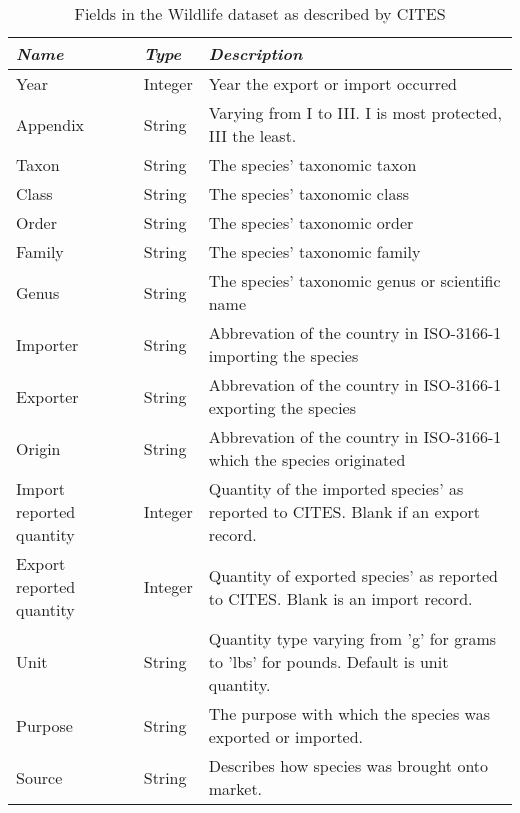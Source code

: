 \begin{table}[!ht]
\begin{tabular}{ l l p{8cm} }
\hline
\emph{Name} & \emph{Type} & \emph{Description} \\
\hline
Year & Integer & Year the export or import occurred \\ \hline
Appendix & String & Varying from I to III. I is most protected, III the least. \\ \hline 
Taxon & String & The species' taxonomic taxon \\ \hline 
Class & String & The species' taxonomic class \\ \hline 
Order & String & The species' taxonomic order \\ \hline 
Family & String & The species' taxonomic family \\ \hline 
Genus & String & The species' taxonomic genus or scientific name \\ \hline 
Importer & String & Abbrevation of the country in ISO-3166-1 importing the species \\ \hline 
Exporter & String & Abbrevation of the country in ISO-3166-1 exporting the species \\ \hline
Origin & String & Abbrevation of the country in ISO-3166-1 which the species originated \\ \hline
Import reported quantity & Integer & Quantity of the imported species' as reported to CITES. Blank if an export record. \\ \hline
Export reported quantity & Integer & Quantity of exported species' as reported to CITES. Blank is an import record. \\ \hline
Unit & String & Quantity type varying from 'g' for grams to 'lbs' for pounds. Default is unit quantity. \\ \hline
Purpose & String & The purpose with which the species was exported or imported. \\ \hline
Source & String & Describes how species was brought onto market. \\ \hline
\end{tabular}
\caption{Fields in the Wildlife dataset as described by CITES} \label{tbl:dataset-fields}
\end{table}